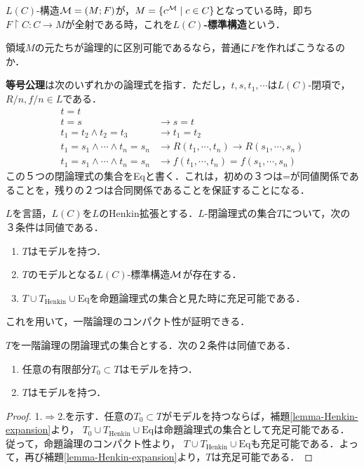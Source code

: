 \documentclass[uplatex, 12pt, dvipdfmx]{jsreport}
\begin{document}
\begin{definition}
    $L(C)$-構造$\mathcal{M}=(M;F)$が，$M=\{c^{\mathcal{M}}\mid c\in C\}$となっている時，即ち$F\restriction C:C\to M$が全射である時，これを\textbf{$L(C)$-標準構造}という．
\end{definition}
\begin{remark}
    領域$M$の元たちが論理的に区別可能であるなら，普通に$F$を作ればこうなるのか．
\end{remark}
\begin{definition}\label{axiom-equiality}
    \textbf{等号公理}は次のいずれかの論理式を指す．ただし，$t,s,t_1,\cdots$は$L(C)$-閉項で，$R/n,f/n\in L$である．
    \begin{align*}
        t=t&\\
        t=s&\to s=t\\
        t_1=t_2\land t_2=t_3&\to t_1=t_2\\
        t_1=s_1\land\cdots\land t_n=s_n&\to R(t_1,\cdots,t_n)\to R(s_1,\cdots,s_n)\\
        t_1=s_1\land\cdots\land t_n=s_n&\to f(t_1,\cdots,t_n)=f(s_1,\cdots,s_n)
    \end{align*}
    この５つの閉論理式の集合をEqと書く．これは，初めの３つは=が同値関係であることを，残りの２つは合同関係であることを保証することになる．
\end{definition}

\begin{lemma}\label{lemma-Henkin-expansion}
    $L$を言語，$L(C)$を$L$のHenkin拡張とする．$L$-閉論理式の集合$T$について，次の３条件は同値である．
    \begin{enumerate}
        \item $T$はモデルを持つ．
        \item $T$のモデルとなる$L(C)$-標準構造$\mathcal{M}$が存在する．
        \item $T\cup T_\mathrm{Henkin}\cup\mathrm{Eq}$を命題論理式の集合と見た時に充足可能である．
    \end{enumerate}
\end{lemma}

これを用いて，一階論理のコンパクト性が証明できる．
\begin{theorem}
    $T$を一階論理の閉論理式の集合とする．次の２条件は同値である．
    \begin{enumerate}
        \item 任意の有限部分$T_0\subset T$はモデルを持つ．
        \item $T$はモデルを持つ．
    \end{enumerate}
\end{theorem}
\begin{proof}
    1.$\Rightarrow$2.を示す．任意の$T_0\subset T$がモデルを持つならば，補題\ref{lemma-Henkin-expansion}より，
    $T_0\cup T_\mathrm{Henkin}\cup\mathrm{Eq}$は命題論理式の集合として充足可能である．従って，命題論理のコンパクト性より，
    $T\cup T_\mathrm{Henkin}\cup\mathrm{Eq}$も充足可能である．よって，再び補題\ref{lemma-Henkin-expansion}より，$T$は充足可能である．
\end{proof}
\end{document}
